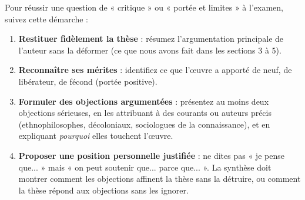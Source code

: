 \documentclass[11pt]{article}
\begin{document}
\begin{methode}
Pour réussir une question de « critique » ou « portée et limites » à l'examen, suivez cette démarche :
\begin{enumerate}
\item \textbf{Restituer fidèlement la thèse} : résumez l'argumentation principale de l'auteur sans la déformer (ce que nous avons fait dans les sections 3 à 5).
\item \textbf{Reconnaître ses mérites} : identifiez ce que l'œuvre a apporté de neuf, de libérateur, de fécond (portée positive).
\item \textbf{Formuler des objections argumentées} : présentez au moins deux objections sérieuses, en les attribuant à des courants ou auteurs précis (ethnophilosophes, décoloniaux, sociologues de la connaissance), et en expliquant \emph{pourquoi} elles touchent l'œuvre.
\item \textbf{Proposer une position personnelle justifiée} : ne dites pas « je pense que... » mais « on peut soutenir que... parce que... ». La synthèse doit montrer comment les objections affinent la thèse sans la détruire, ou comment la thèse répond aux objections sans les ignorer.
\end{enumerate}
\end{methode}
\end{document}
